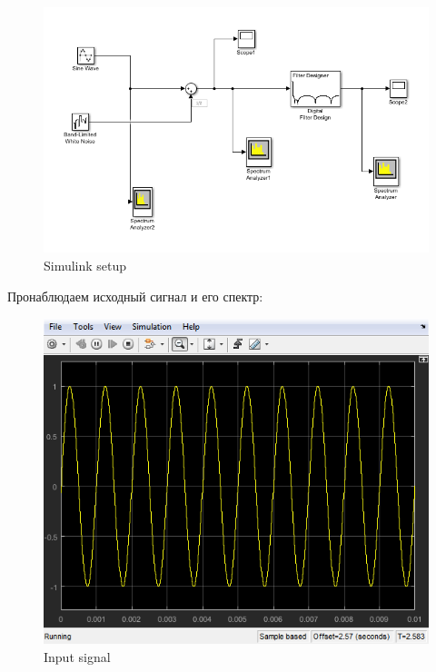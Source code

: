 \documentclass[a4paper,14pt]{extarticle}
\begin{document}
\begin{figure}[H]
    \centering
    \includegraphics{simulink}
	\captionsetup{justification=centering,margin=1cm}
    \caption{Simulink setup}
    \label{fig:simulink}
\end{figure}

Пронаблюдаем исходный сигнал и его спектр:

\begin{figure}[H]
    \centering
    \includegraphics{input}
	\captionsetup{justification=centering,margin=1cm}
    \caption{Input signal}
    \label{fig:input}
\end{figure}
\end{document}
